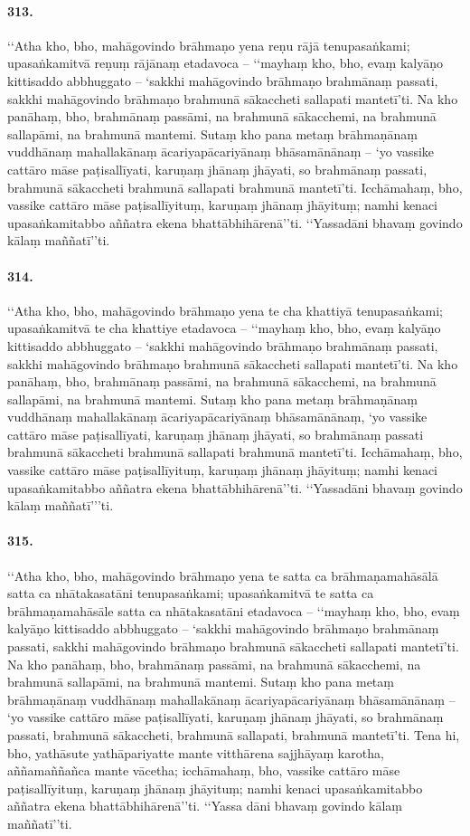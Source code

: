 \paragraph{313.} ‘‘Atha kho, bho, mahāgovindo brāhmaṇo yena reṇu rājā tenupasaṅkami; upasaṅkamitvā reṇuṃ rājānaṃ etadavoca – ‘‘mayhaṃ kho, bho, evaṃ kalyāṇo kittisaddo abbhuggato – ‘sakkhi mahāgovindo brāhmaṇo brahmānaṃ passati, sakkhi mahāgovindo brāhmaṇo brahmunā sākaccheti sallapati mantetī’ti. Na kho panāhaṃ, bho, brahmānaṃ passāmi, na brahmunā sākacchemi, na brahmunā sallapāmi, na brahmunā mantemi. Sutaṃ kho pana metaṃ brāhmaṇānaṃ vuddhānaṃ mahallakānaṃ ācariyapācariyānaṃ bhāsamānānaṃ – ‘yo vassike cattāro māse paṭisallīyati, karuṇaṃ jhānaṃ jhāyati, so brahmānaṃ passati, brahmunā sākaccheti brahmunā sallapati brahmunā mantetī’ti. Icchāmahaṃ, bho, vassike cattāro māse paṭisallīyituṃ, karuṇaṃ jhānaṃ jhāyituṃ; namhi kenaci upasaṅkamitabbo aññatra ekena bhattābhihārenā’’ti. ‘‘Yassadāni bhavaṃ govindo kālaṃ maññatī’’ti.

\paragraph{314.} ‘‘Atha kho, bho, mahāgovindo brāhmaṇo yena te cha khattiyā tenupasaṅkami; upasaṅkamitvā te cha khattiye etadavoca – ‘‘mayhaṃ kho, bho, evaṃ kalyāṇo kittisaddo abbhuggato – ‘sakkhi mahāgovindo brāhmaṇo brahmānaṃ passati, sakkhi mahāgovindo brāhmaṇo brahmunā sākaccheti sallapati mantetī’ti. Na kho panāhaṃ, bho, brahmānaṃ passāmi, na brahmunā sākacchemi, na brahmunā sallapāmi, na brahmunā mantemi. Sutaṃ kho pana metaṃ brāhmaṇānaṃ vuddhānaṃ mahallakānaṃ ācariyapācariyānaṃ bhāsamānānaṃ, ‘yo vassike cattāro māse paṭisallīyati, karuṇaṃ jhānaṃ jhāyati, so brahmānaṃ passati brahmunā sākaccheti brahmunā sallapati brahmunā mantetī’ti. Icchāmahaṃ, bho, vassike cattāro māse paṭisallīyituṃ, karuṇaṃ jhānaṃ jhāyituṃ; namhi kenaci upasaṅkamitabbo aññatra ekena bhattābhihārenā’’ti. ‘‘Yassadāni bhavaṃ govindo kālaṃ maññatī’’’ti.

\paragraph{315.} ‘‘Atha kho, bho, mahāgovindo brāhmaṇo yena te satta ca brāhmaṇamahāsālā satta ca nhātakasatāni tenupasaṅkami; upasaṅkamitvā te satta ca brāhmaṇamahāsāle satta ca nhātakasatāni etadavoca – ‘‘mayhaṃ kho, bho, evaṃ kalyāṇo kittisaddo abbhuggato – ‘sakkhi mahāgovindo brāhmaṇo brahmānaṃ passati, sakkhi mahāgovindo brāhmaṇo brahmunā sākaccheti sallapati mantetī’ti. Na kho panāhaṃ, bho, brahmānaṃ passāmi, na brahmunā sākacchemi, na brahmunā sallapāmi, na brahmunā mantemi. Sutaṃ kho pana metaṃ brāhmaṇānaṃ vuddhānaṃ mahallakānaṃ ācariyapācariyānaṃ bhāsamānānaṃ – ‘yo vassike cattāro māse paṭisallīyati, karuṇaṃ jhānaṃ jhāyati, so brahmānaṃ passati, brahmunā sākaccheti, brahmunā sallapati, brahmunā mantetī’ti. Tena hi, bho, yathāsute yathāpariyatte mante vitthārena sajjhāyaṃ karotha, aññamaññañca mante vācetha; icchāmahaṃ, bho, vassike cattāro māse paṭisallīyituṃ, karuṇaṃ jhānaṃ jhāyituṃ; namhi kenaci upasaṅkamitabbo aññatra ekena bhattābhihārenā’’ti. ‘‘Yassa dāni bhavaṃ govindo kālaṃ maññatī’’ti.

